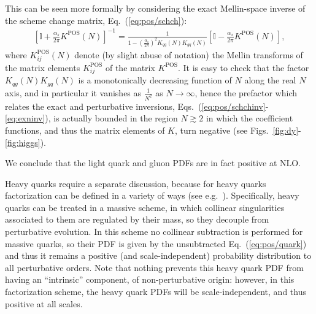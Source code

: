 This can be seen more formally by considering the exact Mellin-space
inverse of the scheme change matrix, Eq.~(\ref{eq:pos/schch}):
\begin{align}\label{eq:pos/exninv}
\left[\mathbb{I}
  +\frac{\alpha_s}{2\pi}  K^{\textrm{POS}}(N) \right] ^{-1}=
\frac{1}{1-\left(\frac{\alpha_s}{2\pi}\right)^2 K_{qg}(N)K_{gq}(N) } \left[\mathbb{I}
  -\frac{\alpha_s}{2\pi}  K^{\textrm{POS}}(N)\right],
\end{align}
where $K^{\textrm{POS}}_{ij}(N)$ denote (by slight abuse of notation) the Mellin
transforms of the matrix elements $K^{\textrm{POS}}_{ij}$ of the matrix
$K^{\textrm{POS}}$.
It is easy to check that the factor $ K_{qg}(N)K_{gq}(N)$ is a
monotonically decreasing function of $N$ along the real $N$ axis, and
in particular it vanishes as $\frac{1}{N^2}$ as $N\to\infty$, hence
the prefactor which relates the exact and perturbative inversions,
Eqs.~(\ref{eq:pos/schchinv}-\ref{eq:exninv}), is actually bounded in the
region $N\gtrsim 2$ in which the \msbar{} coefficient functions, and
thus the matrix elements of $K$, turn negative (see Figs.~\ref{fig:dy}-\ref{fig:higgs}). 

We conclude that the light quark and gluon \msbar{} PDFs are in fact positive
at NLO.

Heavy quarks require a separate discussion, because for heavy quarks \msbar{}
factorization can be defined in a variety of ways (see
e.g.~\cite{Forte:2010ta}).
Specifically, heavy quarks can be treated in a
massive scheme, in which   collinear singularities
associated to them are regulated by their mass, so they decouple from
perturbative evolution. In this scheme no collinear subtraction is
performed for massive quarks, so their PDF is given by the
unsubtracted 
Eq.~(\ref{eq:pos/quark})  and thus it remains a  positive (and
scale-independent) probability distribution to all perturbative
orders. Note that nothing prevents this heavy quark PDF from having an
``intrinsic''  component, of non-perturbative origin: however, in this
factorization scheme, the heavy quark PDFs will be scale-independent,
and thus positive at all scales.

